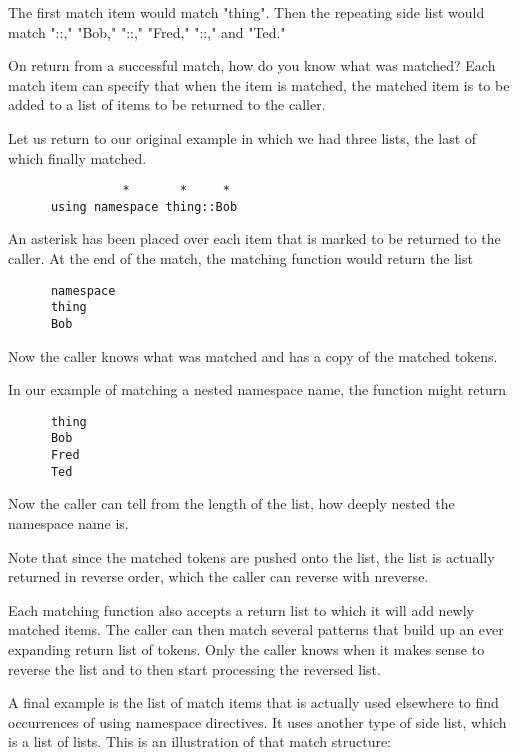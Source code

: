 The first match item would match "thing".  Then the repeating side list would
match "::," "Bob," "::," "Fred," "::," and "Ted."

On return from a successful match, how do you know what was matched?  Each
match item can specify that when the item is matched, the matched item is to
be added to a list of items to be returned to the caller.

Let us return to our original example in which we had three lists, the last
of which finally matched.

\small{\begin{verbatim}
                *       *     *
      using namespace thing::Bob
\end{verbatim}}

An asterisk has been placed over each item that is marked to be returned to
the caller.  At the end of the match, the matching function would return the
list

\small{\begin{verbatim}
      namespace
      thing
      Bob
\end{verbatim}}

Now the caller knows what was matched and has a copy of the matched tokens.

In our example of matching a nested namespace name, the function might return

\small{\begin{verbatim}
      thing
      Bob
      Fred
      Ted
\end{verbatim}}

Now the caller can tell from the length of the list, how deeply nested the
namespace name is.

Note that since the matched tokens are pushed onto the list, the list is
actually returned in reverse order, which the caller can reverse with
nreverse.

Each matching function also accepts a return list to which it will add newly
matched items.  The caller can then match several patterns that build up an
ever expanding return list of tokens.  Only the caller knows when it makes
sense to reverse the list and to then start processing the reversed list.

A final example is the list of match items that is actually used elsewhere to
find occurrences of using namespace directives.  It uses another type of side
list, which is a list of lists.  This is an illustration of that match
structure:




